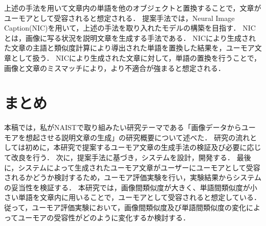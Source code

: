 \documentclass[twocolumn,2pt]{jarticle}
\begin{document}
上述の手法を用いて文章内の単語を他のオブジェクトと置換することで，文章がユーモアとして受容されると想定される．
提案手法では，Neural Image Caption(NIC)\cite{NIC}を用いて，上述の手法を取り入れたモデルの構築を目指す．
NICとは，画像に写る状況を説明文章を生成する手法である．
NICにより生成された文章の主語と類似度計算により導出された単語を置換した結果を，ユーモア文章として扱う．
NICにより生成された文章に対して，単語の置換を行うことで，画像と文章のミスマッチにより，より不適合が強まると想定される．

\section{まとめ}
本稿では，私がNAISTで取り組みたい研究テーマである「画像データからユーモアを想起させる説明文章の生成」の研究概要について述べた．
研究の流れとしては初めに，本研究で提案するユーモア文章の生成手法の検証及び必要に応じて改良を行う．
次に，提案手法に基づき，システムを設計，開発する．
最後に，システムによって生成されたユーモア文章がユーザーにユーモアとして受容されるかどうか検討するため，ユーモア評価実験を行い，実験結果からシステムの妥当性を検証する．
本研究では，画像間類似度が大きく、単語間類似度が小さい単語を文章内に用いることで，ユーモアとして受容されると想定している．
従って，ユーモア評価実験において，画像間類似度及び単語間類似度の変化によってユーモアの受容性がどのように変化するか検討する．




\end{document}
